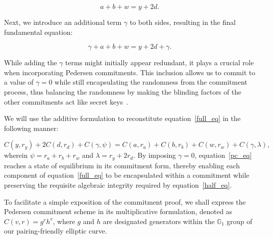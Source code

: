 \documentclass[version=preprint]{iacrcc}
\begin{document}
\begin{equation}
\label{half_eq}
a + b + w = y + 2d.
\end{equation}

Next, we introduce an additional term \( \gamma \) to both sides, resulting in the final fundamental equation:

\begin{equation}
\label{full_eq}
\gamma + a + b + w = y + 2d + \gamma.
\end{equation}

While adding the \( \gamma \) terms might initially appear redundant, it plays a crucial role when incorporating Pedersen commitments. This inclusion allows us to commit to a value of \( \gamma = 0 \) while still encapsulating the randomness from the commitment process, thus balancing the randomness by making the blinding factors of the other commitments act like secret keys~\cite{mw16}.

We will use the additive formulation to reconstitute equation~\ref{full_eq} in the following manner:

\begin{equation}
\label{pc_eq}
C(y, r_{y}) + 2 C(d, r_{d}) + C(\gamma, \psi) = C(a, r_{a}) + C(b, r_{b}) + C(w, r_{w}) + C(\gamma, \lambda),
\end{equation}
wherein \( \psi = r_{a} + r_{b} + r_{w} \) and \( \lambda = r_{y} + 2r_{d} \). By imposing \( \gamma = 0 \), equation~\ref{pc_eq} reaches a state of equilibrium in its commitment form, thereby enabling each component of equation~\ref{full_eq} to be encapsulated within a commitment while preserving the requisite algebraic integrity required by equation~\ref{half_eq}.

To facilitate a simple exposition of the commitment proof, we shall express the Pedersen commitment scheme in its multiplicative formulation, denoted as \( C(v, r) = g^{r} h^{v} \), where \( g \) and \( h \) are designated generators within the \( \mathbb{G}_{1} \) group of our pairing-friendly elliptic curve. 
\end{document}
